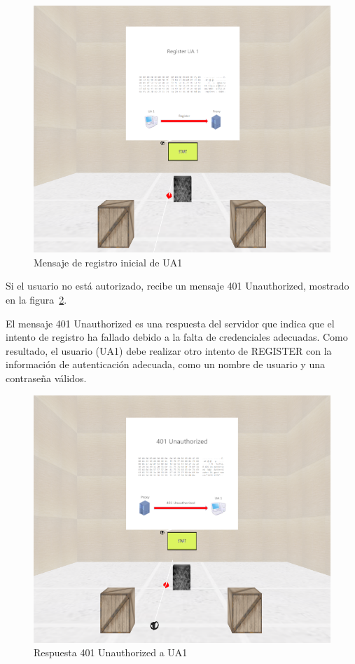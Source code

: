 \documentclass[a4paper, 12pt]{book}
\begin{document}
\begin{figure}[H]
  \centering
  \includegraphics[width=12cm, keepaspectratio]{img/resultados/01-Register_UA1.PNG}
  \caption{Mensaje de registro inicial de UA1}
  \label{fig:01-Register_UA1}
\end{figure}
\clearpage

Si el usuario no está autorizado, recibe un mensaje 401 Unauthorized, mostrado en la figura~\ref{fig:02-Unauthorized}. 

El mensaje 401 Unauthorized es una respuesta del servidor que indica que el intento de registro ha fallado debido a la falta de 
credenciales adecuadas. Como resultado, el usuario (UA1) debe realizar otro intento de REGISTER con la información de autenticación 
adecuada, como un nombre de usuario y una contraseña válidos.

\bigskip

\begin{figure}[H]
  \centering
  \includegraphics[width=12cm, keepaspectratio]{img/resultados/02-Unautorized.PNG}
  \caption{Respuesta 401 Unauthorized a UA1}
  \label{fig:02-Unauthorized}
\end{figure}
\clearpage
\end{document}
